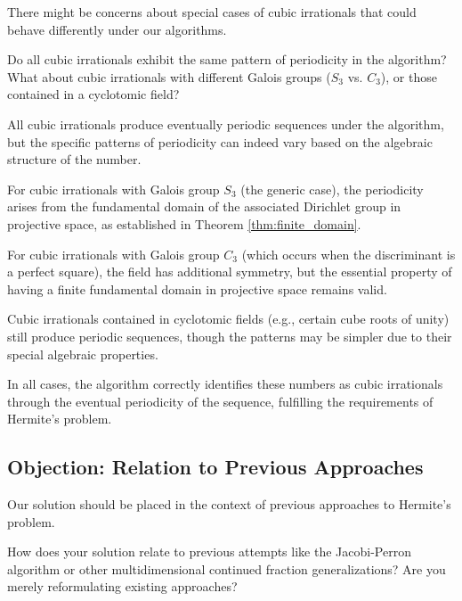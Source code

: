 There might be concerns about special cases of cubic irrationals that could behave differently under our algorithms.

\begin{objection}
Do all cubic irrationals exhibit the same pattern of periodicity in the \HAPD{} algorithm? What about cubic irrationals with different Galois groups ($S_3$ vs. $C_3$), or those contained in a cyclotomic field?
\end{objection}

\begin{response}
All cubic irrationals produce eventually periodic sequences under the \HAPD{} algorithm, but the specific patterns of periodicity can indeed vary based on the algebraic structure of the number.

For cubic irrationals with Galois group $S_3$ (the generic case), the periodicity arises from the fundamental domain of the associated Dirichlet group in projective space, as established in Theorem \ref{thm:finite_domain}.

For cubic irrationals with Galois group $C_3$ (which occurs when the discriminant is a perfect square), the field has additional symmetry, but the essential property of having a finite fundamental domain in projective space remains valid.

Cubic irrationals contained in cyclotomic fields (e.g., certain cube roots of unity) still produce periodic sequences, though the patterns may be simpler due to their special algebraic properties.

In all cases, the \HAPD{} algorithm correctly identifies these numbers as cubic irrationals through the eventual periodicity of the sequence, fulfilling the requirements of Hermite's problem.
\end{response}

\subsection{Objection: Relation to Previous Approaches}

Our solution should be placed in the context of previous approaches to Hermite's problem.

\begin{objection}
How does your solution relate to previous attempts like the Jacobi-Perron algorithm \cite{Perron1907} or other multidimensional continued fraction generalizations? Are you merely reformulating existing approaches?
\end{objection}


